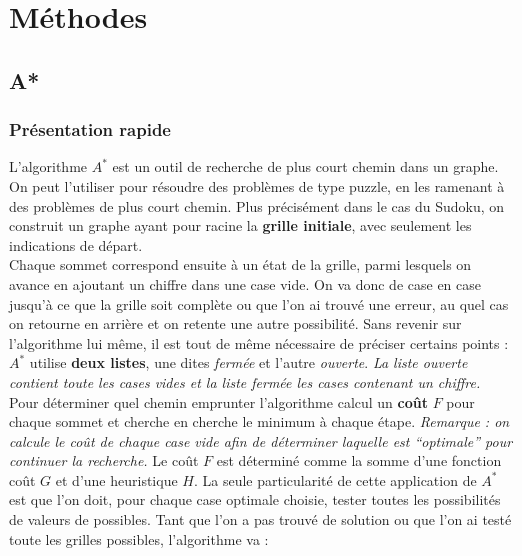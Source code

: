 \chapter{Méthodes}
    \section{A*}
        \subsection{Présentation rapide}
            L'algorithme $A^*$ est un outil de recherche de plus court chemin dans un graphe. On peut l'utiliser pour résoudre des problèmes de type puzzle, en les ramenant à des problèmes de plus court chemin. Plus précisément dans le cas du Sudoku, on construit un graphe ayant pour racine la \textbf{grille initiale}, avec seulement les indications de départ.\\
            Chaque sommet correspond ensuite à un état de la grille, parmi lesquels on avance en ajoutant un chiffre dans une case vide. On va donc de case en case jusqu'à ce que la grille soit complète ou que l'on ai trouvé une erreur, au quel cas on retourne en arrière et on retente une autre possibilité.
            \bigskip
            Sans revenir sur l'algorithme lui même, il est tout de même nécessaire de préciser certains points : $A^*$ utilise \textbf{deux listes}, une dites \textit{fermée} et l'autre \textit{ouverte}. \textit{La liste ouverte contient toute les cases vides et la liste fermée les cases contenant un chiffre.}\\
            Pour déterminer quel chemin emprunter l'algorithme calcul un \textbf{coût} $F$ pour chaque sommet et cherche en cherche le minimum à chaque étape. \textit{Remarque : on calcule le coût de chaque case vide afin de déterminer laquelle est ``optimale'' pour continuer la recherche.} Le coût $F$ est déterminé comme la somme d'une fonction coût $G$ et d'une heuristique $H$.
            \bigskip
            La seule particularité de cette application de $A^*$ est que l'on doit, pour chaque case optimale choisie, tester toutes les possibilités de valeurs de possibles. Tant que l'on a pas trouvé de solution ou que l'on ai testé toute les grilles possibles, l'algorithme va :
